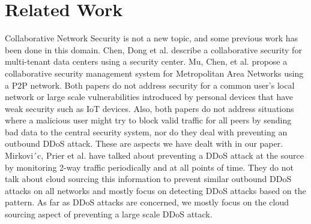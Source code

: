 \vspace{0.1in}
\section{Related Work}
\label{sec:related}

Collaborative Network Security is not a new topic, and some previous work has been done in this domain. Chen,  Dong et al. \cite {collaborative} describe a collaborative security for multi-tenant data centers using a security center. Mu, Chen, et al. \cite {metro} propose a collaborative security management system for Metropolitan Area Networks using a P2P network. Both papers do not address security for a common user's local network or large scale vulnerabilities introduced by personal devices that have weak security such as IoT devices. Also, both papers do not address situations where a malicious user might try to block valid traffic for all peers by sending bad data to the central security system, nor do they deal with preventing an outbound DDoS attack. These are aspects we have dealt with in our paper. Mirkovi´c, Prier et al. \cite{attackddos} have talked about preventing a DDoS attack at the source by monitoring 2-way traffic periodically and at all points of time. They do not talk about cloud sourcing this information to prevent similar outbound DDoS attacks on all networks and mostly focus on detecting DDoS attacks based on the pattern. As far as DDoS attacks are concerned, we mostly focus on the cloud sourcing aspect of preventing a large scale DDoS attack.